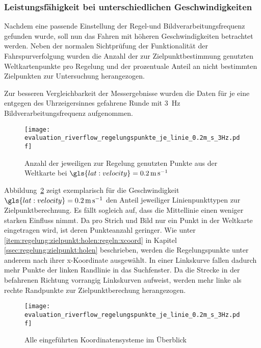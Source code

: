 \subsubsection{Leistungsfähigkeit bei unterschiedlichen Geschwindigkeiten}

Nachdem eine passende Einstellung der Regel-und Bildverarbeitungsfrequenz gefunden wurde, soll nun das Fahren mit höheren Geschwindigkeiten betrachtet werden. Neben der normalen Sichtprüfung der Funktionalität der Fahrspurverfolgung wurden die Anzahl der zur Zielpunktbestimmung genutzten Weltkartenpunkte pro Regelung und der prozentuale Anteil an nicht bestimmten Zielpunkten zur Untersuchung herangezogen. 

Zur besseren Vergleichbarkeit der Messergebnisse wurden die Daten für je eine entgegen des Uhrzeigersinnes gefahrene Runde mit \SI{3}{\hertz} Bildverarbeitungsfrequenz aufgenommen.

\begin{figure}[h] %
	\centering
	\texttt{[image: evaluation\_riverflow\_regelungspunkte\_je\_linie\_0.2m\_s\_3Hz.pdf]}
	\caption{Anzahl der jeweiligen zur Regelung genutzten Punkte aus der Weltkarte bei \( \gls{lat:velocity} = \SI{0,2}{\metre\per\second} \)}
	\label{fig:evaluation:riverflow:regelungspunkte_je_linie}
\end{figure}

Abbildung~\ref{fig:evaluation:riverflow:regelungspunkte_je_linie} zeigt exemplarisch für die Geschwindigkeit \( \gls{lat:velocity} = \SI{0,2}{\metre\per\second} \) den  Anteil jeweiliger Linienpunkttypen zur Zielpunktberechnung. Es fällt sogleich auf, dass die Mittellinie einen weniger starken Einfluss nimmt. Da pro Strich und Bild nur ein Punkt in der Weltkarte eingetragen wird, ist deren Punkteanzahl geringer. Wie unter \ref{item:regelung:zielpunkt:holen:regeln:xcoord} in Kapitel \ref{ssec:regelung:zielpunkt:holen} beschrieben, werden die Regelungspunkte unter anderem nach ihrer x-Koordinate ausgewählt. In einer Linkskurve fallen dadurch mehr Punkte der linken Randlinie in das Suchfenster. Da die Strecke in der befahrenen Richtung vorrangig Linkskurven aufweist, werden mehr linke als rechte Randpunkte zur Zielpunktberechung herangezogen.

\begin{figure}[h] %
	\centering
	\texttt{[image: evaluation\_riverflow\_regelungspunkte\_je\_linie\_0.2m\_s\_3Hz.pdf]}
	\caption{Alle eingeführten Koordinatensysteme im Überblick}
	\label{fig:evaluation:riverflow:regelungspunkte_je_linie}
\end{figure}